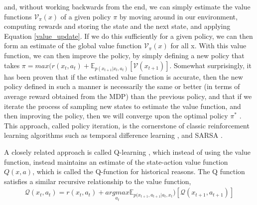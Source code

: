 and, without working backwards from the end, we can simply estimate the value functions $\mathcal{V}_\pi(x)$ of a given policy $\pi$ by moving around in our environment, computing rewards and storing the state and the next state, and applying Equation \ref{value_update}. If we do this sufficiently for a given policy, we can then form an estimate of the global value function $\mathcal{V}_\pi(x)$ for all x. With this value function, we can then improve the policy, by simply defining a new policy that takes $\pi = max(r(x_t,a_t) + \mathbb{E}_{p(x_{t+1} |x_t, a_t)}[\mathcal{V}(x_{t+1})]$. Somewhat surprisingly, it has been proven that if the estimated value function is accurate, then the new policy defined in such a manner is necessarily the same or better (in terms of average reward obtained from the MDP) than the previous policy, and that if we iterate the process of sampling new states to estimate the value function, and then improving the policy, then we will converge upon the optimal policy $\pi^*$ \citep{sutton2018reinforcement}. This approach, called policy iteration, is the cornerstone of classic reinforcement learning algorithms such as temporal difference learning \citep{sutton1988learning}, and SARSA \citep{sutton1996generalization,singh1996reinforcement}.

 A closely related approach is called Q-learning \citep{watkins1992q}, which instead of using the value function, instead maintains an estimate of the state-action value function $Q(x,a)$, which is called the Q-function for historical reasons. The Q function satisfies a similar recursive relationship to the value function,
\begin{align*}
\mathcal{Q}(x_t,a_t) = r(x_t,a_t) + \underset{a_t}{argmax} \mathbb{E}_{p(x_{t+1},a_{t+1} | a_t,x_t})[\mathcal{Q}(x_{t+1},a_{t+1})]
\end{align*}

